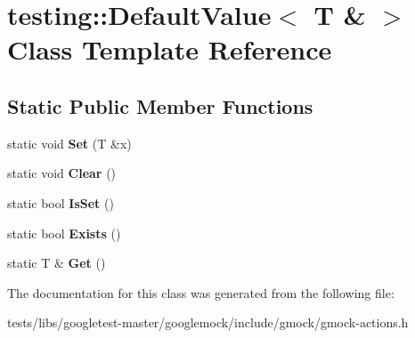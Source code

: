 \hypertarget{classtesting_1_1DefaultValue_3_01T_01_6_01_4}{}\section{testing\+:\+:Default\+Value$<$ T \& $>$ Class Template Reference}
\label{classtesting_1_1DefaultValue_3_01T_01_6_01_4}
\subsection*{Static Public Member Functions}
\begin{DoxyCompactItemize}
\item 
\mbox{\label{classtesting_1_1DefaultValue_3_01T_01_6_01_4_a9863abf3d311ce5007d7e57dfce2f252}} 
static void {\bfseries Set} (T \&x)
\item 
\mbox{\label{classtesting_1_1DefaultValue_3_01T_01_6_01_4_a3c8f9f81e591370f9b33798f58ca1a10}} 
static void {\bfseries Clear} ()
\item 
\mbox{\label{classtesting_1_1DefaultValue_3_01T_01_6_01_4_a3e61547c2f0141cc8004385f3a9c817d}} 
static bool {\bfseries Is\+Set} ()
\item 
\mbox{\label{classtesting_1_1DefaultValue_3_01T_01_6_01_4_a38420499e17d2fb4146ae6c4265f0d55}} 
static bool {\bfseries Exists} ()
\item 
\mbox{\label{classtesting_1_1DefaultValue_3_01T_01_6_01_4_a1310448dd8c171aecfcbf7c8df5de7bd}} 
static T \& {\bfseries Get} ()
\end{DoxyCompactItemize}


The documentation for this class was generated from the following file\+:\begin{DoxyCompactItemize}
\item 
tests/libs/googletest-\/master/googlemock/include/gmock/gmock-\/actions.\+h\end{DoxyCompactItemize}
